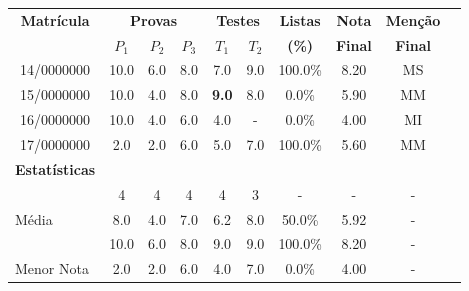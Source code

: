 \begin{longtable}{cccccccccc}
\toprule
\multirow{2}{*}{\textbf{Matrícula}} & \multicolumn{3}{c}{\textbf{Provas}} & \multicolumn{2}{c}{\textbf{Testes}} & \textbf{Listas} & \textbf{Nota} & \textbf{Menção} \\
 & \textbf{$P_1$} & \textbf{$P_2$} & \textbf{$P_3$} & \textbf{$T_1$} & \textbf{$T_2$} & \textbf{(\%)} & \textbf{Final} & \textbf{Final} \\
\toprule
\rowcolor[gray]{.9}
14/0000000 & 10.0 & 6.0 & 8.0 & 7.0 & 9.0 & 100.0\% & 8.20 & MS \\
15/0000000 & 10.0 & 4.0 & 8.0 & \textbf{9.0} & 8.0 & 0.0\% & 5.90 & MM \\
\rowcolor[gray]{.9}
16/0000000 & 10.0 & 4.0 & 6.0 & 4.0 & - & 0.0\% & 4.00 & MI \\
17/0000000 & 2.0 & 2.0 & 6.0 & 5.0 & 7.0 & 100.0\% & 5.60 & MM \\
\toprule
\textbf{Estatísticas} & \multicolumn{9}{c}{} \\
\toprule
\rowcolor[gray]{.9}
\multicolumn{1}{l}{Presentes} & 4 & 4 & 4 & 4 & 3 & - & - & - \\
\multicolumn{1}{l}{Média} & 8.0 & 4.0 & 7.0 & 6.2 & 8.0 & 50.0\% & 5.92 & - \\
\rowcolor[gray]{.9}
\multicolumn{1}{l}{Maior Nota} & 10.0 & 6.0 & 8.0 & 9.0 & 9.0 & 100.0\% & 8.20 & - \\
\multicolumn{1}{l}{Menor Nota} & 2.0 & 2.0 & 6.0 & 4.0 & 7.0 & 0.0\% & 4.00 & - \\
\bottomrule
\end{longtable}

\let\thefootnote\relax{}
